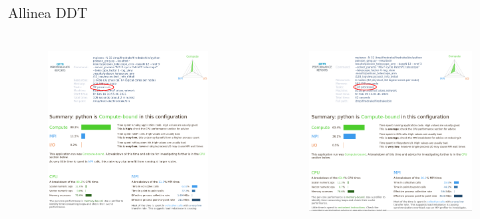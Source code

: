 \documentclass[pdf,aspectratio=169]{beamer}
\begin{document}
\begin{frame}{Allinea DDT}
  \vspace{-1em}
  \begin{columns}[T]
    \begin{column}[T]{0.45\textwidth}
      \begin{figure}
	\includegraphics[width=\textwidth]{ddt_32_circled}
      \end{figure}
    \end{column}
    \quad
    \begin{column}[T]{0.45\textwidth}
      \begin{figure}
	\includegraphics[width=\textwidth]{ddt_128_circled}
      \end{figure}
    \end{column}
  \end{columns}
\end{frame}
\end{document}
